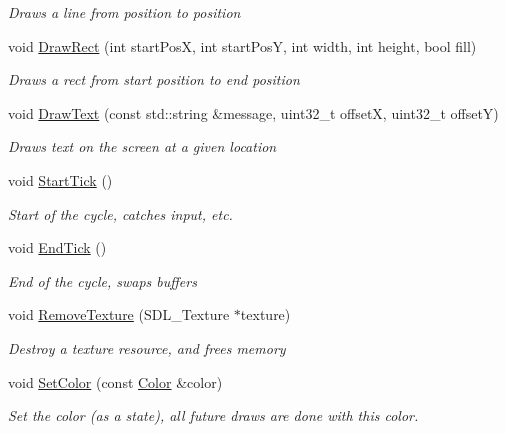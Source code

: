 \begin{DoxyCompactItemize}
\begin{DoxyCompactList}\small\item\em Draws a line from position to position \end{DoxyCompactList}\item 
void \hyperlink{class_f_w_application_a5e8cd6326546fba991c787a481b7005c}{Draw\+Rect} (int start\+Pos\+X, int start\+Pos\+Y, int width, int height, bool fill)
\begin{DoxyCompactList}\small\item\em Draws a rect from start position to end position \end{DoxyCompactList}\item 
void \hyperlink{class_f_w_application_a9af3769859c50a445ef8f0a08fc548ae}{Draw\+Text} (const std\+::string \&message, uint32\+\_\+t offset\+X, uint32\+\_\+t offset\+Y)
\begin{DoxyCompactList}\small\item\em Draws text on the screen at a given location \end{DoxyCompactList}\item 
void \hyperlink{class_f_w_application_a7b04b6b13c221cf67728a7d6372c838c}{Start\+Tick} ()
\begin{DoxyCompactList}\small\item\em Start of the cycle, catches input, etc. \end{DoxyCompactList}\item 
void \hyperlink{class_f_w_application_a6c5dbaaef4d13b0cf17727f8f84ef0fc}{End\+Tick} ()
\begin{DoxyCompactList}\small\item\em End of the cycle, swaps buffers \end{DoxyCompactList}\item 
void \hyperlink{class_f_w_application_afd869f6c0bf21b8bdc780ca9d513553f}{Remove\+Texture} (S\+D\+L\+\_\+\+Texture $\ast$texture)
\begin{DoxyCompactList}\small\item\em Destroy a texture resource, and frees memory \end{DoxyCompactList}\item 
void \hyperlink{class_f_w_application_a45ce0cbf998ae9ed2c79c7bd73f8782a}{Set\+Color} (const \hyperlink{struct_color}{Color} \&color)
\begin{DoxyCompactList}\small\item\em Set the color (as a state), all future draws are done with this color. \end{DoxyCompactList}\item 

\end{DoxyCompactItemize}
